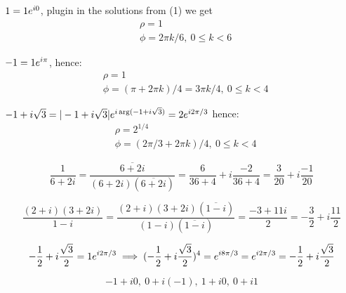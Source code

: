 \begin{cExercise}[][][author][2]
	\begin{cPart}
		$1=1e^{i0}$, plugin in the solutions from (1) we get
		\begin{align*}
			&\rho=1\\
			&\phi=2\pi k/6,\ 0\le k<6
		\end{align*}		
	\end{cPart}
	\begin{cPart}
		$-1=1e^{i\pi}$, hence:
		\begin{align*}
			&\rho=1\\
			&\phi=(\pi+2\pi k)/4=3\pi k/4,\ 0\le k<4
		\end{align*}	
	\end{cPart}
	\begin{cPart}
		$-1+i\sqrt{3}=|-1+i\sqrt{3}|e^{i\arg(-1+i\sqrt{3})}=2e^{i2\pi/3}$ hence:
		\begin{align*}
			&\rho=2^{1/4}\\
			&\phi=(2\pi/3+2\pi k)/4,\ 0\le k<4
		\end{align*}
	\end{cPart}
\end{cExercise}
\begin{cExercise}[][][author]
	\begin{cPart}
		\begin{equation*}
			\frac1{6+2i}=\frac{\overline{6+2i}}{(6+2i)(\overline{6+2i})}=\frac{6}{36+4}+i\frac{-2}{36+4}=\frac{3}{20}+i\frac{-1}{20}
		\end{equation*}
	\end{cPart}
	\begin{cPart}
		\begin{equation*}
			\frac{(2+i)(3+2i)}{1-i}=\frac{(2+i)(3+2i)(\overline{1-i})}{(1-i)(\overline{1-i})}=\frac{-3+11i}{2}=-\frac32+i\frac{11}2
		\end{equation*}
	\end{cPart}
	\begin{cPart}
		\begin{equation*}
			-\frac12+i\frac{\sqrt{3}}2=1e^{i2\pi/3}\implies(-\frac12+i\frac{\sqrt{3}}2)^4=e^{i8\pi/3}=e^{i2\pi/3}=-\frac12+i\frac{\sqrt{3}}2
		\end{equation*}
	\end{cPart}
	\begin{cPart}
		\begin{equation*}
			-1+i0,\ 0+i(-1),\ 1+i0,\ 0+i1
		\end{equation*}
	\end{cPart}
\end{cExercise}
